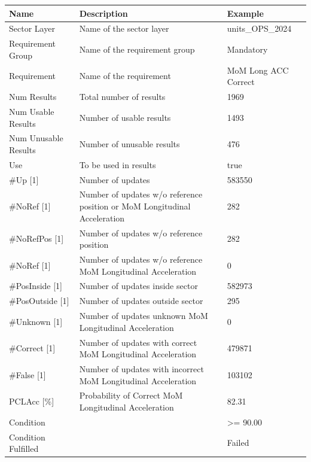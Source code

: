 \begin{center}
 \begin{table}[H]
  \begin{tabularx}{\textwidth}{ | l | X |  l | }
    \hline
    \textbf{Name} & \textbf{Description} & \textbf{Example} \\ \hline
    Sector Layer & Name of the sector layer & units\_OPS\_2024 \\ \hline
    Requirement Group & Name of the requirement group & Mandatory \\ \hline
    Requirement & Name of the requirement & MoM Long ACC Correct \\ \hline
    Num Results & Total number of results & 1969 \\ \hline
    Num Usable Results & Number of usable results & 1493 \\ \hline
    Num Unusable Results & Number of unusable results & 476 \\ \hline
    Use & To be used in results & true \\ \hline
    \#Up [1] & Number of updates & 583550 \\ \hline
    \#NoRef [1] & Number of updates w/o reference position or MoM Longitudinal Acceleration & 282 \\ \hline
    \#NoRefPos [1] & Number of updates w/o reference position & 282 \\ \hline
    \#NoRef [1] & Number of updates w/o reference MoM Longitudinal Acceleration & 0 \\ \hline
    \#PosInside [1] & Number of updates inside sector & 582973 \\ \hline
    \#PosOutside [1] & Number of updates outside sector & 295 \\ \hline
    \#Unknown [1] & Number of updates unknown MoM Longitudinal Acceleration & 0 \\ \hline
    \#Correct [1] & Number of updates with correct MoM Longitudinal Acceleration & 479871 \\ \hline
    \#False [1] & Number of updates with incorrect MoM Longitudinal Acceleration & 103102 \\ \hline
    PCLAcc [\%] & Probability of Correct MoM Longitudinal Acceleration & 82.31 \\ \hline
    Condition &  & >= 90.00 \\ \hline
    Condition Fulfilled &  & Failed \\ \hline
    \end{tabularx}
\end{table}
\end{center}

